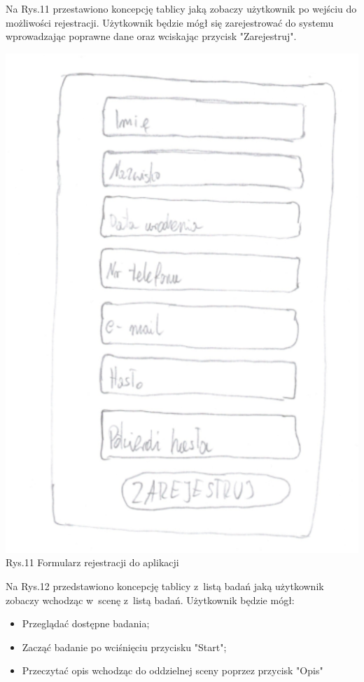 \documentclass[12pt, letterpaper]{article}
\begin{document}
		
		Na Rys.11 przestawiono koncepcję tablicy jaką zobaczy użytkownik po wejściu do możliwości rejestracji. Użytkownik będzie mógł się zarejestrować do systemu wprowadzając poprawne dane oraz wciskając przycisk "Zarejestruj".
		
		\begin{center}
			\includegraphics[scale=0.5]{GUI_rejestracja}\\
			\caption{Rys.11 Formularz rejestracji do aplikacji}
		\end{center}
		
		Na Rys.12 przedstawiono koncepcję tablicy z~listą badań jaką użytkownik zobaczy wchodząc w~scenę z~listą badań. Użytkownik będzie mógł:
		
		\begin{itemize}
			\item Przeglądać dostępne badania;
			\item Zacząć badanie po wciśnięciu przycisku "Start";
			\item Przeczytać opis wchodząc do oddzielnej sceny poprzez przycisk "Opis"
		\end{itemize}
		
\end{document}
